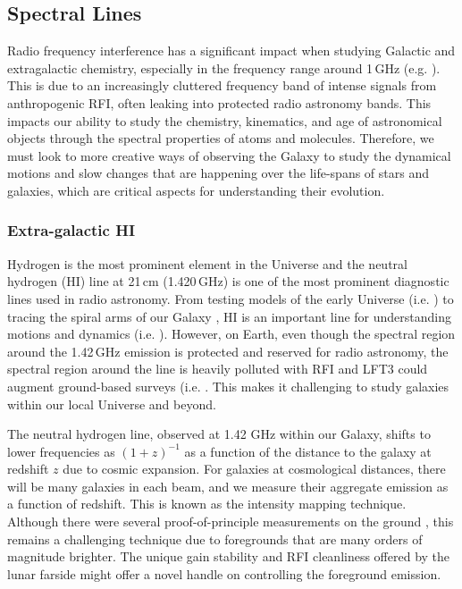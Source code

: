     
    
    

\subsection{Spectral Lines}
Radio frequency interference has a significant impact when studying Galactic and extragalactic chemistry, especially in the frequency range around 1\,GHz (e.g. \citealt{Liang_2023}). This is due to an increasingly cluttered frequency band of intense signals from anthropogenic RFI, often leaking into protected radio astronomy bands. This impacts our ability to study the chemistry, kinematics, and age of astronomical objects through the spectral properties of atoms and molecules. Therefore, we must look to more creative ways of observing the Galaxy to study the dynamical motions and slow changes that are happening over the life-spans of stars and galaxies, which are critical aspects for understanding their evolution.

\subsubsection{Extra-galactic HI}
Hydrogen is the most prominent element in the Universe and the neutral hydrogen (H{\sc I}) line at 21\,cm (1.420\,GHz) is one of the most prominent diagnostic lines used in radio astronomy. From testing models of the early Universe (i.e. \citealt{Meiksin_2022}) to tracing the spiral arms of our Galaxy \citep{HI4PI}, H{\sc I} is an important line for understanding motions and dynamics (i.e. \citealt{Pingel_2022}). However, on Earth, even though the spectral region around the 1.42\,GHz emission is protected and reserved for radio astronomy, the spectral region around the line is heavily polluted with RFI and LFT3 could augment ground-based surveys (i.e. \citealt{Bhat_2005,Rhee_2023}. This makes it challenging to study galaxies within our local Universe and beyond.

The neutral hydrogen line, observed at 1.42 GHz within our Galaxy, shifts to lower frequencies as $(1+z)^{-1}$ as a function of the distance to the galaxy at redshift $z$ due to cosmic expansion. For galaxies at cosmological distances, there will be many galaxies in each beam, and we measure their aggregate emission as a function of redshift. This is known as the intensity mapping technique. Although there were several proof-of-principle measurements on the ground \citep{Paul_2023}, this remains a challenging technique due to foregrounds that are many orders of magnitude brighter. The unique gain stability and RFI cleanliness offered by the lunar farside might offer a novel handle on controlling the foreground emission.  

